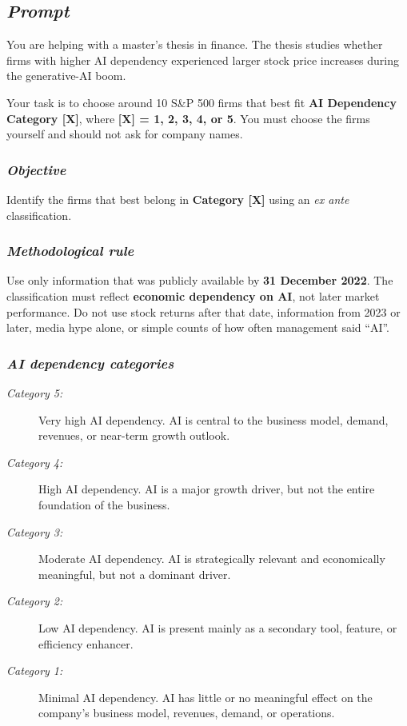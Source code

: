 \documentclass{article}
\begin{document}
{\itshape

\subsection*{\textit{Prompt}}

You are helping with a master’s thesis in finance. The thesis studies whether firms with higher AI dependency experienced larger stock price increases during the generative-AI boom.

Your task is to choose around 10 S\&P 500 firms that best fit \textbf{AI Dependency Category [X]}, where \textbf{[X] = 1, 2, 3, 4, or 5}. You must choose the firms yourself and should not ask for company names.

\subsubsection*{\textit{Objective}}

Identify the firms that best belong in \textbf{Category [X]} using an \textit{ex ante} classification.

\subsubsection*{\textit{Methodological rule}}

Use only information that was publicly available by \textbf{31 December 2022}. The classification must reflect \textbf{economic dependency on AI}, not later market performance. Do not use stock returns after that date, information from 2023 or later, media hype alone, or simple counts of how often management said ``AI''.

\subsubsection*{\textit{AI dependency categories}}

\begin{description}
    \item[\textit{Category 5:}] Very high AI dependency. AI is central to the business model, demand, revenues, or near-term growth outlook.
    \item[\textit{Category 4:}] High AI dependency. AI is a major growth driver, but not the entire foundation of the business.
    \item[\textit{Category 3:}] Moderate AI dependency. AI is strategically relevant and economically meaningful, but not a dominant driver.
    \item[\textit{Category 2:}] Low AI dependency. AI is present mainly as a secondary tool, feature, or efficiency enhancer.
    \item[\textit{Category 1:}] Minimal AI dependency. AI has little or no meaningful effect on the company’s business model, revenues, demand, or operations.
\end{description}

}
\end{document}
